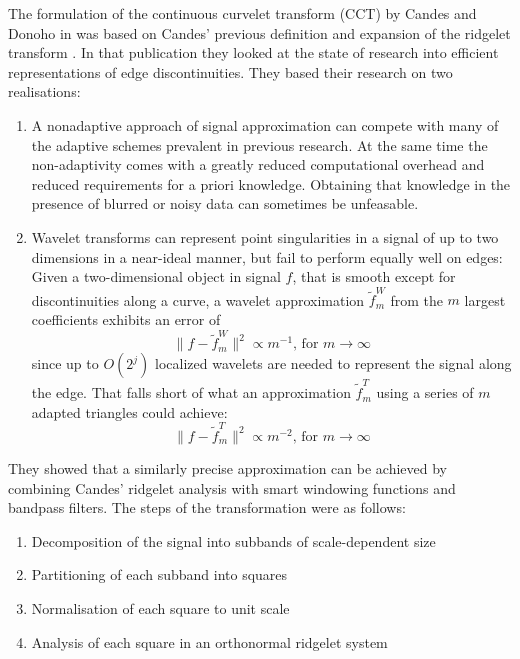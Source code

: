 The formulation of the continuous curvelet transform (CCT) by Candes and Donoho
in \autocite{candes_curvelets:_2000} was based on Candes' previous definition and
expansion of the ridgelet transform \autocite{candes_ridgelets:_1998}. In that
publication they looked at the state of research into efficient representations
of edge discontinuities. They based their research on two realisations:
\begin{enumerate}
    \item A nonadaptive approach of signal approximation can compete with many
        of the adaptive schemes prevalent in previous research. At the same
        time the non-adaptivity comes with a greatly reduced computational
        overhead and reduced requirements for a priori knowledge. Obtaining
        that knowledge in the presence of blurred or noisy data can sometimes
        be unfeasable.
    \item Wavelet transforms can represent point singularities in a signal of
        up to two dimensions in a near-ideal manner, but fail to perform
        equally well on edges: Given a two-dimensional object in signal $f$, that
        is smooth except for discontinuities along a curve, a wavelet
        approximation $\tilde{f}^W_m$ from the $m$ largest coefficients
        exhibits an error of
        \begin{equation*}
            \| f - \tilde{f}^W_m \|^2 \propto m^{-1} \text{, for } m \rightarrow \infty
        \end{equation*}
        since up to $O(2^j)$ localized wavelets are needed to represent the
        signal along the edge. That falls short of what an approximation
        $\tilde{f}^T_m$ using a series of $m$ adapted triangles could achieve:
        \begin{equation*}
            \| f - \tilde{f}^T_m \|^2 \propto m^{-2} \text{, for } m \rightarrow \infty
        \end{equation*}
\end{enumerate}
They showed that a similarly precise approximation can be achieved by combining
Candes' ridgelet analysis \autocite{candes_ridgelets:_1998} with smart
windowing functions and bandpass filters. The steps of the transformation were
as follows:
\begin{enumerate}
    \item Decomposition of the signal into subbands of scale-dependent size
    \item Partitioning of each subband into squares
    \item Normalisation of each square to unit scale
    \item Analysis of each square in an orthonormal ridgelet system
\end{enumerate}


